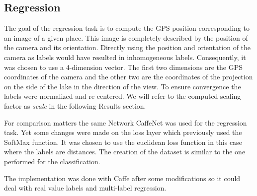 \subsection{Regression}
The goal of the regression task is to compute the GPS position corresponding to an image of a given place. This image is completely described by the position of the camera and its orientation. Directly using the position and orientation of the camera as labels would have resulted in inhomogeneous labels. Consequently, it was chosen to use a 4-dimension vector. The first two dimensions are the GPS coordinates of the camera and the other two are the coordinates of the projection on the side of the lake in the direction of the view. To ensure convergence the labels were normalized and re-centered. We will refer to the computed scaling factor as \textit{scale} in the following Results section.

For comparison matters the same Network CaffeNet was used for the regression task. Yet some changes were made on the loss layer which previously used the SoftMax function. It was chosen to use the euclidean loss function in this case where the labels are distances. The creation of the dataset is similar to the one performed for the classification.

The implementation was done with Caffe after some modifications so it could deal with real value labels and multi-label regression.
